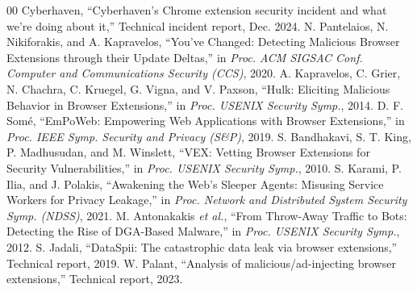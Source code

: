 \documentclass[conference]{IEEEtran}
\begin{document}
\begin{thebibliography}{00}
 Cyberhaven, ``Cyberhaven's Chrome extension security incident and what we're
doing about it,'' Technical incident report, Dec. 2024.
 N. Pantelaios, N. Nikiforakis, and A. Kapravelos, ``You've Changed:
Detecting Malicious Browser Extensions through their Update Deltas,'' in \emph{Proc. ACM SIGSAC
Conf. Computer and Communications Security (CCS)}, 2020.
 A. Kapravelos, C. Grier, N. Chachra, C. Kruegel, G. Vigna, and V. Paxson, ``Hulk:
Eliciting Malicious Behavior in Browser Extensions,'' in \emph{Proc. USENIX Security Symp.}, 2014.
 D. F. Som\'e, ``EmPoWeb: Empowering Web Applications with Browser Extensions,''
in \emph{Proc. IEEE Symp. Security and Privacy (S\&P)}, 2019.
 S. Bandhakavi, S. T. King, P. Madhusudan, and M. Winslett, ``VEX: Vetting Browser
Extensions for Security Vulnerabilities,'' in \emph{Proc. USENIX Security Symp.}, 2010.
 S. Karami, P. Ilia, and J. Polakis, ``Awakening the Web's Sleeper Agents:
Misusing Service Workers for Privacy Leakage,'' in \emph{Proc. Network and Distributed System
Security Symp. (NDSS)}, 2021.
 M. Antonakakis \emph{et al.}, ``From Throw-Away Traffic to Bots: Detecting
the Rise of DGA-Based Malware,'' in \emph{Proc. USENIX Security Symp.}, 2012.
 S. Jadali, ``DataSpii: The catastrophic data leak via browser extensions,''
Technical report, 2019.
 W. Palant, ``Analysis of malicious/ad-injecting browser extensions,'' Technical
report, 2023.
\end{thebibliography}
\end{document}
